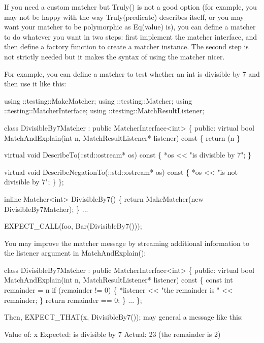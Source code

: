 If you need a custom matcher but {\ttfamily Truly()} is not a good option (for example, you may not be happy with the way {\ttfamily Truly(predicate)} describes itself, or you may want your matcher to be polymorphic as {\ttfamily Eq(value)} is), you can define a matcher to do whatever you want in two steps\+: first implement the matcher interface, and then define a factory function to create a matcher instance. The second step is not strictly needed but it makes the syntax of using the matcher nicer.

For example, you can define a matcher to test whether an {\ttfamily int} is divisible by 7 and then use it like this\+: 
\begin{DoxyCode}
using ::testing::MakeMatcher;
using ::testing::Matcher;
using ::testing::MatcherInterface;
using ::testing::MatchResultListener;

class DivisibleBy7Matcher : public MatcherInterface<int> \{
 public:
  virtual bool MatchAndExplain(int n, MatchResultListener* listener) const \{
    return (n %
  \}

  virtual void DescribeTo(::std::ostream* os) const \{
    *os << "is divisible by 7";
  \}

  virtual void DescribeNegationTo(::std::ostream* os) const \{
    *os << "is not divisible by 7";
  \}
\};

inline Matcher<int> DivisibleBy7() \{
  return MakeMatcher(new DivisibleBy7Matcher);
\}
...

  EXPECT\_CALL(foo, Bar(DivisibleBy7()));
\end{DoxyCode}


You may improve the matcher message by streaming additional information to the {\ttfamily listener} argument in {\ttfamily Match\+And\+Explain()}\+:


\begin{DoxyCode}
class DivisibleBy7Matcher : public MatcherInterface<int> \{
 public:
  virtual bool MatchAndExplain(int n,
                               MatchResultListener* listener) const \{
    const int remainder = n %
    if (remainder != 0) \{
      *listener << "the remainder is " << remainder;
    \}
    return remainder == 0;
  \}
  ...
\};
\end{DoxyCode}


Then, {\ttfamily E\+X\+P\+E\+C\+T\+\_\+\+T\+H\+A\+T(x, Divisible\+By7());} may general a message like this\+: 
\begin{DoxyCode}
Value of: x
Expected: is divisible by 7
  Actual: 23 (the remainder is 2)
\end{DoxyCode}


